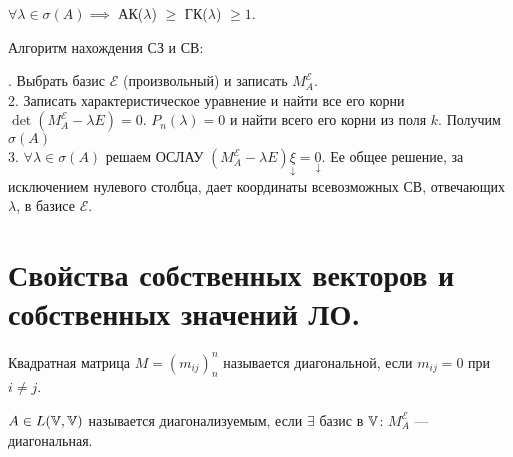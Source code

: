 \documentclass[../main.tex]{subfiles}
\begin{document}
\begin{theorem}
    $\forall \lambda \in \sigma(A ) \implies$ АК($\lambda$) $\geqslant $ ГК($\lambda$) $\geqslant 1$. 
\end{theorem}
Алгоритм нахождения СЗ и СВ:

. Выбрать базис $\mathcal{E}$ (произвольный) и записать $M_{A}^{\mathcal{E}}$.
\\2. Записать характеристическое уравнение и найти все его корни $\det{(M_{A}^{\mathcal{E}}- \lambda E)} = 0$. $P_{n}(\lambda) = 0$ и найти всего его корни из поля $k$. Получим $\sigma(A)$
\\3. $\forall \lambda \in \sigma(A)$ решаем ОСЛАУ $(M_{A}^{\mathcal{E}}-\lambda E)\underset{\downarrow}{\xi} = \underset{\downarrow}{0}$. Ее общее решение, за исключением нулевого столбца, дает координаты всевозможных СВ, отвечающих $\lambda$, в базисе $\mathcal{E}$.
\section{Свойства собственных векторов и собственных значений ЛО.}

\begin{definition}
    Квадратная матрица $M = (m_{ij})_{n}^n$ называется диагональной, если $m_{ij} = 0$ при $i \neq j$.
\end{definition}
\begin{definition}
    $A \in L(\mathbb{V}, \mathbb{V})$ называется диагонализуемым, если $\exists$ базис в $\mathbb{V}$: $M_A^{\mathcal{E}}$ — диагональная.
\end{definition}
\end{document}
